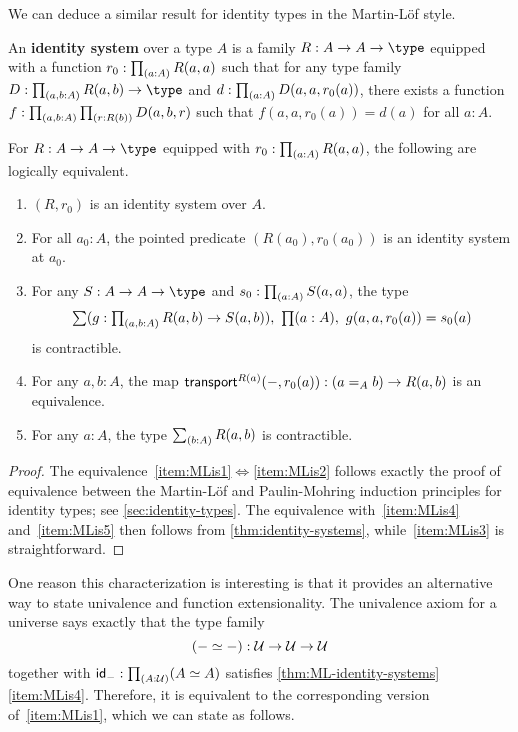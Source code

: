 We can deduce a similar result for identity types in the Martin-L\"of style.

\begin{defn}
  An \textbf{identity system} over a type $A$ is a family $R:A\to A\to \type$ equipped with a function $r_0:\prd{a:A} R(a,a)$ such that for any type family $D:\prd{a,b:A} R(a,b) \to \type$ and $d:\prd{a:A} D(a,a,r_0(a))$, there exists a function $f:\prd{a,b:A}{r:R(b)} D(a,b,r)$ such that $f(a,a,r_0(a))=d(a)$ for all $a:A$.
\end{defn}

\begin{thm}\label{thm:ML-identity-systems}
  For $R:A\to A\to\type$ equipped with $r_0:\prd{a:A} R(a,a)$, the following are logically equivalent.
  \begin{enumerate}
  \item $(R,r_0)$ is an identity system over $A$.\label{item:MLis1}
  \item For all $a_0:A$, the pointed predicate $(R(a_0),r_0(a_0))$ is an identity system at $a_0$.\label{item:MLis2}
  \item For any $S:A\to A\to\type$ and $s_0:\prd{a:A} S(a,a)$, the type
    \[ \sm{g:\prd{a,b:A} R(a,b) \to S(a,b)} \prd{a:A} g(a,a,r_0(a)) = s_0(a) \]
    is contractible.\label{item:MLis3}
  \item For any $a,b:A$, the map $\mathsf{transport}^{R(a)}(-,r_0(a)) : (a =_A b) \to R(a,b)$ is an equivalence.\label{item:MLis4}
  \item For any $a:A$, the type $\sm{b:A} R(a,b)$ is contractible.\label{item:MLis5}
  \end{enumerate}
\end{thm}
\begin{proof}
  The equivalence~\ref{item:MLis1}$\Leftrightarrow$\ref{item:MLis2} follows exactly the proof of equivalence between the Martin-L\"of and Paulin-Mohring induction principles for identity types; see \autoref{sec:identity-types}.
  The equivalence with~\ref{item:MLis4} and~\ref{item:MLis5} then follows from \autoref{thm:identity-systems}, while~\ref{item:MLis3} is straightforward.
\end{proof}

One reason this characterization is interesting is that it provides an alternative way to state univalence and function extensionality.
The univalence axiom for a universe \UU says exactly that the type family
\[ (- \simeq -) : \mathcal{U}\to\mathcal{U}\to\mathcal{U} \]
together with $\idfunc[-] : \prd{A:\UU} (\eqv AA)$ satisfies \autoref{thm:ML-identity-systems}\ref{item:MLis4}.
Therefore, it is equivalent to the corresponding version of~\ref{item:MLis1}, which we can state as follows.

